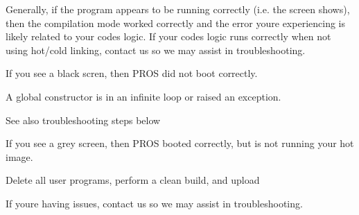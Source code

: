 Generally, if the program appears to be running correctly (i.\+e. the screen shows), then the compilation mode worked correctly and the error you\textquotesingle{}re experiencing is likely related to your code\textquotesingle{}s logic. If your code\textquotesingle{}s logic runs correctly when not using hot/cold linking, contact us so we may assist in troubleshooting.

If you see a black scren, then P\+R\+OS did not boot correctly.


\begin{DoxyItemize}
\item A global constructor is in an infinite loop or raised an exception.
\item See also troubleshooting steps below
\end{DoxyItemize}

If you see a grey screen, then P\+R\+OS booted correctly, but is not running your hot image.


\begin{DoxyItemize}
\item Delete all user programs, perform a clean build, and upload
\end{DoxyItemize}

If you\textquotesingle{}re having issues, contact us so we may assist in troubleshooting. 